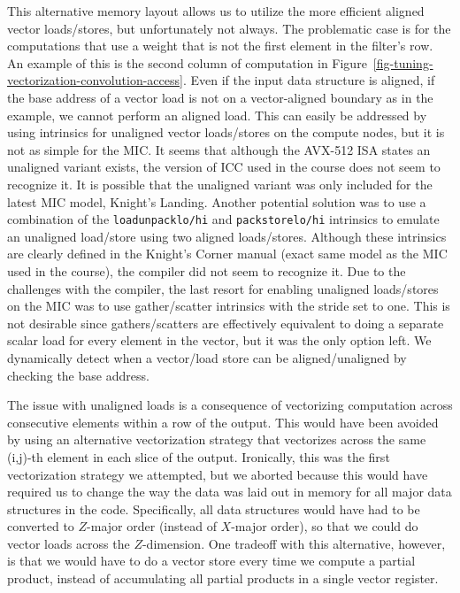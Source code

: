 This alternative memory layout allows us to utilize the more efficient
aligned vector loads/stores, but unfortunately not always. The
problematic case is for the computations that use a weight that is not
the first element in the filter's row. An example of this is the second
column of computation in
Figure~\ref{fig-tuning-vectorization-convolution-access}. Even if the
input data structure is aligned, if the base address of a vector load is
not on a vector-aligned boundary as in the example, we cannot perform an
aligned load. This can easily be addressed by using intrinsics for
unaligned vector loads/stores on the compute nodes, but it is not as
simple for the MIC. It seems that although the AVX-512 ISA states an
unaligned variant exists, the version of ICC used in the course does not
seem to recognize it. It is possible that the unaligned variant was only
included for the latest MIC model, Knight's Landing. Another potential
solution was to use a combination of the \texttt{loadunpacklo/hi} and
\texttt{packstorelo/hi} intrinsics to emulate an unaligned load/store
using two aligned loads/stores. Although these intrinsics are clearly
defined in the Knight's Corner manual (exact same model as the MIC used
in the course), the compiler did not seem to recognize it. Due to the
challenges with the compiler, the last resort for enabling unaligned
loads/stores on the MIC was to use gather/scatter intrinsics with the
stride set to one. This is not desirable since gathers/scatters are
effectively equivalent to doing a separate scalar load for every element
in the vector, but it was the only option left. We dynamically detect
when a vector/load store can be aligned/unaligned by checking the base
address.

The issue with unaligned loads is a consequence of vectorizing
computation across consecutive elements within a row of the output. This
would have been avoided by using an alternative vectorization strategy
that vectorizes across the same (i,j)-th element in each slice of the
output. Ironically, this was the first vectorization strategy we
attempted, but we aborted because this would have required us to change
the way the data was laid out in memory for all major data structures in
the code. Specifically, all data structures would have had to be
converted to $Z$-major order (instead of $X$-major order), so that we
could do vector loads across the $Z$-dimension. One tradeoff with this
alternative, however, is that we would have to do a vector store every
time we compute a partial product, instead of accumulating all partial
products in a single vector register.
